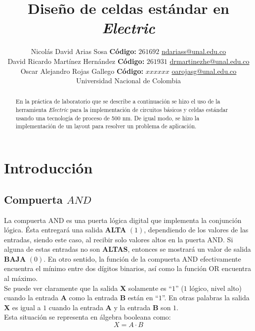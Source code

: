 \documentclass[twocolumn]{IEEEtran}
\begin{document}
\title{Diseño de celdas estándar en \textit{Electric}}
\author{Nicolás David Arias Sosa \textbf{Código:} $261692$ \url{ndariass@unal.edu.co}\\
	David Ricardo Martínez Hernández \textbf{Código:} $261931$ \url{drmartinezhe@unal.edu.co}\\
	Oscar Alejandro Rojas Gallego \textbf{Código:} $xxxxxx$ \url{oarojasg@unal.edu.co}\\
	Universidad Nacional de Colombia}
\markboth{}{}
\maketitle
\begin{abstract}
En la práctica de laboratorio que se describe a continuación se hizo el uso de la herramienta \textit{Electric} para la implementación de circuitos básicos y celdas estándar usando una tecnología de proceso de 500 nm. De igual modo, se hizo la implementación de un layout para resolver un problema de aplicación.
\end{abstract}
\begin{keywords}

\end{keywords}

\section{Introducción}
\subsection{Compuerta $AND$}
\noindent
La compuerta AND es una puerta lógica digital que implementa la conjunción lógica. Ésta entregará una salida \textbf{ALTA} $(1)$, dependiendo de los valores de las entradas, siendo este caso, al recibir solo valores altos en la puerta AND. Si alguna de estas entradas no son \textbf{ALTAS}, entonces se mostrará un valor de salida \textbf{BAJA} $(0)$. En otro sentido, la función de la compuerta AND efectivamente encuentra el mínimo entre dos dígitos binarios, así como la función OR encuentra al máximo.\\
Se puede ver claramente que la salida {\bf X} solamente es ``$1$'' ($1$ lógico, nivel alto) cuando la entrada {\bf A} como la entrada {\bf B} están en ``$1$''. En otras palabras la salida {\bf X} es igual a $1$ cuando la entrada {\bf A} y la entrada {\bf B} son $1$.\\
Esta situación se representa en álgebra booleana como:
\begin{equation}
 X  =  A \cdot B
 \label{ecu1}
\end{equation}
\end{document}
